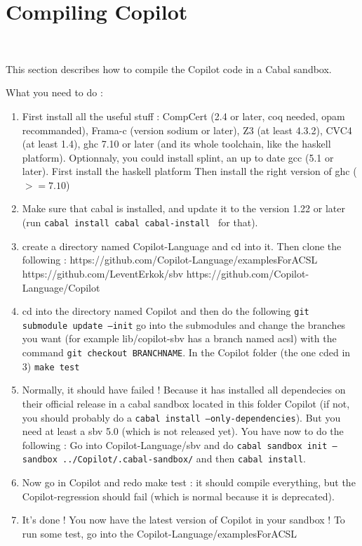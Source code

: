\section{Compiling Copilot}~\label{sec:compile}

This section describes how to compile the Copilot code in a Cabal sandbox.

What you need to do : 
\begin{enumerate}
\item First install all the useful stuff : CompCert (2.4 or later, coq needed, opam recommanded), Frama-c (version sodium or later), Z3 (at least 4.3.2), CVC4 (at least 1.4), ghc 7.10 or later (and its whole toolchain, like the haskell platform).
\subitem Optionnaly, you could install splint, an up to date gcc (5.1 or later). 
\subitem First install the haskell platform
\subitem Then install the right version of ghc ($>= 7.10$)
\item Make sure that cabal is installed, and update it to the version 1.22 or later (run \texttt{cabal install cabal cabal-install } for that). 
\item create a directory named Copilot-Language and cd into it. Then clone the following :
\subitem https://github.com/Copilot-Language/examplesForACSL
\subitem https://github.com/LeventErkok/sbv
\subitem https://github.com/Copilot-Language/Copilot
\item cd into the directory named Copilot and then do the following
\subitem \texttt{git submodule update --init}
\subitem go into the submodules and change the branches you want (for example lib/copilot-sbv has a branch named acsl) with the command \texttt{git checkout BRANCHNAME}. 
\subitem In the Copilot folder (the one cded in 3) \texttt{make test}
\item Normally, it should have failed ! Because it has installed all dependecies on their official release in a cabal sandbox located in this folder Copilot (if not, you should probably do a \texttt{cabal install --only-dependencies}). But you need at least a sbv 5.0 (which is not released yet). You have now to do the following :
\subitem Go into Copilot-Language/sbv and do \texttt{cabal sandbox init --sandbox ../Copilot/.cabal-sandbox/} and then \texttt{cabal install}.
\item Now go in Copilot and redo make test : it should compile everything, but the Copilot-regression should fail (which is normal because it is deprecated).
\item It's done ! You now have the latest version of Copilot in your sandbox ! To run some test, go into the Copilot-Language/examplesForACSL
\end{enumerate}

